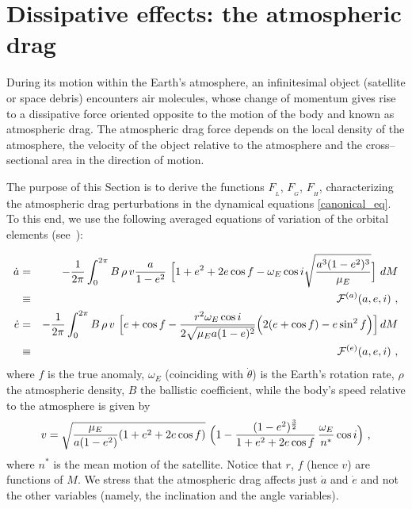 \documentclass[12pt,reqno]{amsart}
\numberwithin{equation}{section}
\newcommand\beqa[1]{ \begin{eqnarray} \label{#1}}
\newcommand{\eeqa}{ \end{eqnarray} }
\def\F{{\mathcal F}}
\begin{document}
\section{Dissipative effects: the atmospheric drag} \label{sec:diss_effect_drag}



During its motion within the Earth's atmosphere, an infinitesimal object (satellite or space debris) encounters air molecules, whose change of momentum gives rise to a dissipative  force
oriented opposite to the motion of the body and known as atmospheric drag.
The atmospheric drag force depends on the local density of the atmosphere, the velocity of the object
relative to the atmosphere and the cross--sectional area in the direction of motion.

The purpose of this Section is to derive the functions $F_{_L}$, $F_{_G}$, $F_{_H}$, characterizing the atmospheric drag perturbations in the dynamical equations \eqref{canonical_eq}.
To this end, we use the following averaged equations of variation of the orbital elements (see~\cite{Liu, Chao}):

\beqa{dissae}
\dot a&=&-{1\over {2\pi}}\int_0^{2\pi}B\, \rho\, v{a\over {1-e^2}}\ \Big[1+e^2+2e\cos f-\omega_E\cos i\sqrt{{a^3(1-e^2)^3}\over {\mu_E}}\Big]\ dM\nonumber\\
&\equiv&\F^{(a)}(a,e,i)\ ,\nonumber\\
\dot e&=&-{1\over {2\pi}}\int_0^{2\pi}B\, \rho\, v\ \Big[e+\cos f-{{r^2\omega_E\cos i}\over{2\sqrt{\mu_E a(1-e)^2}}}\Big(2(e+\cos f)-e\sin^2f\Big)\Big]\, dM\nonumber\\
&\equiv&\F^{(e)}(a,e,i)\ ,
\eeqa
where $f$ is the true anomaly, $\omega_E$ (coinciding with $\dot{\theta}$) is
the Earth's rotation rate, $\rho$ the atmospheric density, $B$
the ballistic coefficient, while the body's speed relative to the atmosphere is given by
\begin{equation}\label{speed}
v=\sqrt{{\mu_E\over a(1-e^2)}(1+e^2+2e\cos f)}\ \Big(1-{{(1-e^2)^{3\over 2}}\over {1+e^2+2e\cos f}}\, {\omega_E\over n^*}\cos i\Big)\ ,
\end{equation}
where $n^*$ is the mean motion of the satellite.
Notice that $r$, $f$ (hence $v$) are functions of $M$.
We stress that the atmospheric drag affects just $\dot{a}$ and $\dot{e}$ and not the other variables
(namely, the inclination and the angle variables).
\end{document}
